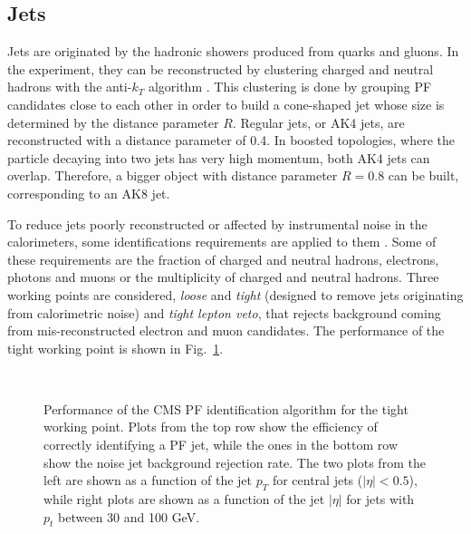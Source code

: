 \documentclass[../main.tex]{subfiles}
\begin{document}
\subsection{Jets}
\label{intro:subsec:jets}

Jets are originated by the hadronic showers produced from quarks and gluons. In the experiment, they can be reconstructed by clustering charged and neutral hadrons with the anti-$k_T$ algorithm \cite{intro:id:antikt}. This clustering is done by grouping PF candidates close to each other in order to build a cone-shaped jet whose size is determined by the distance parameter $R$. Regular jets, or AK4 jets, are reconstructed with a distance parameter of 0.4. In boosted topologies, where the particle decaying into two jets has very high momentum, both AK4 jets can overlap. Therefore, a bigger object with distance parameter $R=0.8$ can be built, corresponding to an AK8 jet. 

To reduce jets poorly reconstructed or affected by instrumental noise in the calorimeters, some identifications requirements are applied to them \cite{intro:id:pfjetid}. Some of these requirements are the fraction of charged and neutral hadrons, electrons, photons and muons or the multiplicity of charged and neutral hadrons. Three working points are considered, \textit{loose} and \textit{tight} (designed to remove jets originating from calorimetric noise) and \textit{tight lepton veto}, that rejects background coming from mis-reconstructed electron and muon candidates. The performance of the tight working point is shown in Fig.~\ref{intro:fig:jetid}.

\begin{figure}[h!]
\begin{center}
\\
\end{center}
\caption{Performance of the CMS PF identification algorithm for the tight working point. Plots from the top row show the efficiency of correctly identifying a PF jet, while the ones in the bottom row show the noise jet background rejection rate. The two plots from the left are shown as a function of the jet $p_T$ for central jets ($|\eta|<0.5$), while right plots are shown as a function of the jet $|\eta|$ for jets with $p_t$ between 30 and 100 GeV.}
\label{intro:fig:jetid}
\end{figure}
\end{document}
